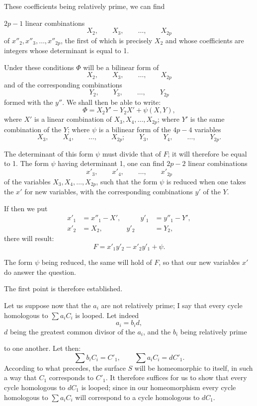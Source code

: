 \documentclass{article}
\begin{document}
These coefficients being relatively prime, we can find

$2p - 1$ linear combinations
\[ X_{2}, \qquad X_{3}, \qquad \ldots, \qquad X_{2p} \]
of $x''_{2}, x''_{3}, \ldots, x''_{2p}$, the first of which is precisely $X_{2}$ and whose coefficients are integers whose determinant is equal to 1.

Under these conditions $\Phi$ will be a bilinear form of
\[ X_{2}, \qquad X_{3}, \qquad \ldots, \qquad X_{2p} \]
and of the corresponding combinations
\[ Y_{2}, \qquad Y_{3}, \qquad \ldots, \qquad Y_{2p} \]
formed with the $y''$. We shall then be able to write:
\[ \Phi = X_{2} Y' - Y_{2} X' + \psi(X, Y), \]
where $X'$ is a linear combination of $X_{3}, X_{4}, \ldots, X_{2p}$; where $Y'$ is the same combination of the $Y$; where $\psi$ is a bilinear form of the $4p - 4$ variables
\[ X_{3}, \qquad X_{4}, \qquad \ldots, \qquad X_{2p}; \qquad Y_{3}, \qquad Y_{4}, \qquad \ldots, \qquad Y_{2p}. \]

The determinant of this form $\psi$ must divide that of $F$; it will therefore be equal to 1. The form $\psi$ having determinant 1, one can find $2p - 2$ linear combinations
\[ x'_{3}, \qquad x'_{4}, \qquad \ldots, \qquad x'_{2p} \]
of the variables $X_{3}, X_{4}, \ldots, X_{2p}$, such that the form $\psi$ is reduced when one takes the $x'$ for new variables, with the corresponding combinations $y'$ of the $Y$.

If then we put
\[ \begin{aligned} x'_{1} &= x''_{1} - X', &\qquad y'_{1} &= y''_{1} - Y', \\ x'_{2} &= X_{2}, & y'_{2} &= Y_{2}, \end{aligned} \]
there will result:
\[ F = x'_{1}y'_{2} - x'_{2}y'_{1} + \psi. \]

The form $\psi$ being reduced, the same will hold of $F$, so that our new variables $x'$ do answer the question.

The first point is therefore established.

Let us suppose now that the $a_{i}$ are not relatively prime; I say that every cycle homologous to $\displaystyle\sum a_{i} C_{i}$ is looped. Let indeed
\[ a_{i} = b_{i} d, \]
$d$ being the greatest common divisor of the $a_{i}$, and the $b_{i}$ being relatively prime

to one another. Let then:
\[ \sum b_{i} C_{i} = C'_{1}, \qquad \sum a_{i} C_{i} = dC'_{1}. \]
According to what precedes, the surface $S$ will be homeomorphic to itself, in such a way that $C_{1}$ corresponds to $C'_{1}$. It therefore suffices for us to show that every cycle homologous to $dC_{1}$ is looped; since in our homeomorphism every cycle homologous to $\displaystyle\sum a_{i} C_{i}$ will correspond to a cycle homologous to $dC_{1}$.
\end{document}
